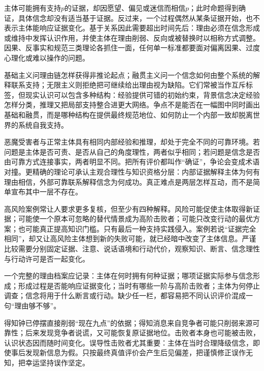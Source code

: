 主体可能拥有支持$p$的证据，却因愿望、偏见或迷信而相信$p$；此时命题得到确证，具体信念却没有适当基于证据。反过来，一个过程偶然从某条证据开始，也不表示主体能响应证据变化。基于关系因此需要超出时间先后：理由必须在信念形成或维持中发挥认识作用，并使主体在理由削弱、反向或被替换时以相称方式调整。因果、反事实和规范三类理论各抓住一面，任何单一标准都要面对偏离因果、过度心理化或难以操作的问题。

基础主义问理由链怎样获得非推论起点；融贯主义问一个信念如何由整个系统的解释联系支持；无限主义则拒绝把可继续给出理由视为缺陷。它们常被当作互斥标签，但现实认识可以包含多种结构：经验提供可错的初始约束，背景信念决定经验怎样分类，推理又把局部支持整合进更大网络。争点不是能否在一幅图中同时画出基础和融贯，而是哪种结构在提供最终规范地位、如何防止一个内部一致却脱离世界的系统自我支持。

恶魔受害者与正常主体具有相同内部经验和推理，却处于完全不同的可靠环境。若问题是主体是否可责、是否从自己的角度理性，两者似乎相同；若问题是信念是否由可靠方式连接事实，两者明显不同。把所有评价都叫作“确证”，争论会变成术语对撞。更精确的理论可承认主观合理性与知识资格分层：内部证据解释主体为何有理由相信，外部可靠联系解释信念为何成功。真正难点是两层怎样互动，而不是简单宣布其中一层不存在。

高风险案例常让人要求更多复核，但至少有四种解释。风险可能促使主体取得新证据；可能使一个原本可忽略的替代情景成为高阶击败者；可能只改变行动的最优方案；也可能真正提高知识门槛。只有最后一种支持实践侵入。案例若说“证据完全相同”，却又让高风险主体想到新的失败可能，就已经暗中改变了主体信息。严谨比较需要分别固定证据、注意、说话语境和行动代价，观察知识、断言、信念理性与行动许可是否一起变化。

\begin{argumentbox}
一个完整的理由档案应记录：主体在何时拥有何种证据；哪项证据实际参与信念形成；形成过程是否能响应证据变化；当时有哪些一阶与高阶击败者；主体为何停止调查；信念将用于什么断言或行动。缺少任一栏，都容易把不同认识评价混成一句“理由够不够”。
\end{argumentbox}

得知钟已停摆直接削弱“现在九点”的依据；得知消息来自竞争者可能只削弱来源可靠性；后来发现竞争者说谎，又可能恢复原证据地位。击败者本身也可能被击败，认识状态因而随时间变化。误导性击败者尤其重要：主体在当时合理降级信念，即使事后发现新信息为假。只按最终真值评价会产生后见偏差，把谨慎修正误作无知，把幸运坚持误作坚定。


